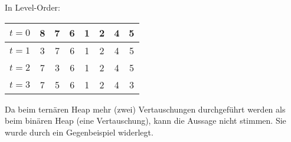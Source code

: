 \documentclass[a4paper]{scrartcl}
\begin{document}
\begin{enumerate}[(a)]
\begin{enumerate}[(i)]
                In Level-Order: \medskip \\
                \begin{tabular}{|l|c|c|c|c|c|c|c|}
                    \hline
                    $t = 0$ & 8 & 7 & 6 & 1 & 2 & 4 & 5 \\ \hline
                    $t = 1$ & 3 & 7 & 6 & 1 & 2 & 4 & 5 \\ \hline
                    $t = 2$ & 7 & 3 & 6 & 1 & 2 & 4 & 5 \\ \hline
                    $t = 3$ & 7 & 5 & 6 & 1 & 2 & 4 & 3 \\ \hline
                \end{tabular}

        \end{enumerate}
        Da beim ternären Heap mehr (zwei) Vertauschungen durchgeführt werden als
        beim binären Heap (eine Vertauschung), kann die Aussage nicht stimmen.
        Sie wurde durch ein Gegenbeispiel widerlegt.

\end{enumerate}
\end{document}
